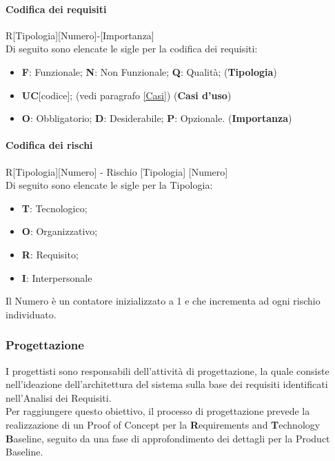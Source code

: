 \paragraph{Codifica dei requisiti}

R[Tipologia][Numero]-[Importanza] \\
Di seguito sono elencate le sigle per la codifica dei requisiti: 
\begin{itemize}
    \item \textbf{F}: Funzionale; \textbf{N}: Non Funzionale; \textbf{Q}: Qualità; (\textbf{Tipologia})
    \item \textbf{UC}[codice]; (vedi paragrafo \ref{Casi}) (\textbf{Casi d'uso})
    \item \textbf{O}: Obbligatorio; \textbf{D}: Desiderabile; \textbf{P}: Opzionale. (\textbf{Importanza})
\end{itemize}

\paragraph{Codifica dei rischi}\label{codRischi}

R[Tipologia][Numero] - Rischio [Tipologia] [Numero] \\
Di seguito sono elencate le sigle per la Tipologia: 
\begin{itemize}
    \item \textbf{T}: Tecnologico;
    \item \textbf{O}: Organizzativo;
    \item \textbf{R}: Requisito;
    \item \textbf{I}: Interpersonale
\end{itemize}
Il Numero è un contatore inizializzato a 1 e che incrementa ad ogni rischio individuato.

\subsubsection{Progettazione} 
I progettisti sono responsabili dell'attività di progettazione, la quale consiste nell'ideazione dell'architettura del sistema sulla base dei requisiti 
identificati nell'Analisi dei Requisiti. \\
Per raggiungere questo obiettivo, il processo di progettazione prevede la realizzazione di un Proof of Concept\glo 
per la \textbf{R}equirements and \textbf{T}echnology \textbf{B}aseline, seguito da una fase di approfondimento dei dettagli per la Product Baseline.

